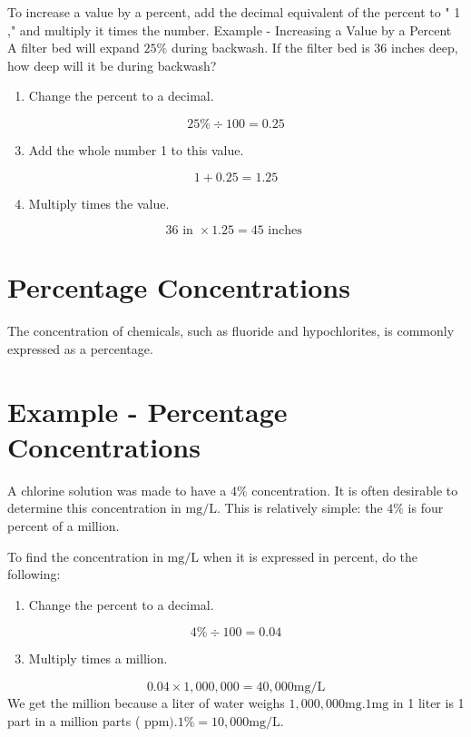 To increase a value by a percent, add the decimal equivalent of the percent to " 1 ," and multiply it times the number. Example - Increasing a Value by a Percent\\

A filter bed will expand $25 \%$ during backwash. If the filter bed is 36 inches deep, how deep will it be during backwash?\\

\begin{enumerate}
  \item Change the percent to a decimal.
\end{enumerate}
$$
25 \% \div 100=0.25
$$

\begin{enumerate}
  \setcounter{enumi}{2}
  \item Add the whole number 1 to this value.
\end{enumerate}
$$
1+0.25=1.25
$$

\begin{enumerate}
  \setcounter{enumi}{3}
  \item Multiply times the value.
\end{enumerate}
$$
36 \text { in } \times 1.25=45 \text { inches }
$$

\section{Percentage Concentrations}
The concentration of chemicals, such as fluoride and hypochlorites, is commonly expressed as a percentage.

\section{Example - Percentage Concentrations}
A chlorine solution was made to have a $4 \%$ concentration. It is often desirable to determine this concentration in $\mathrm{mg} / \mathrm{L}$. This is relatively simple: the $4 \%$ is four percent of a million.

To find the concentration in $\mathrm{mg} / \mathrm{L}$ when it is expressed in percent, do the following:

\begin{enumerate}
  \item Change the percent to a decimal.
\end{enumerate}
$$
4 \% \div 100=0.04
$$

\begin{enumerate}
  \setcounter{enumi}{2}
  \item Multiply times a million.
\end{enumerate}
$$
0.04 \times 1,000,000=40,000 \mathrm{mg} / \mathrm{L}
$$
We get the million because a liter of water weighs $1,000,000 \mathrm{mg} .1 \mathrm{mg}$ in 1 liter is 1 part in a million parts ( $\mathrm{ppm}) .1 \%=10,000 \mathrm{mg} / \mathrm{L}$.

